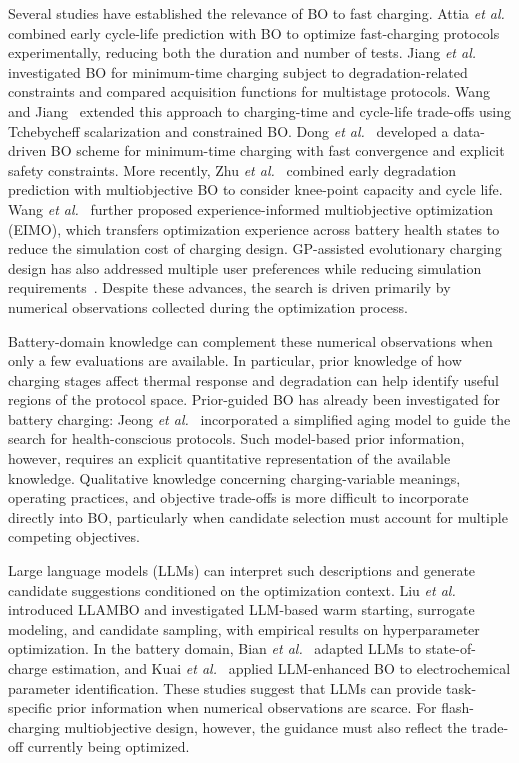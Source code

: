 Several studies have established the relevance of BO to fast charging.
Attia \emph{et al.}~\cite{nref3} combined early cycle-life prediction with BO
to optimize fast-charging protocols experimentally, reducing both the duration
and number of tests. Jiang \emph{et al.}~\cite{nref7} investigated BO for
minimum-time charging subject to degradation-related constraints and compared
acquisition functions for multistage protocols. Wang and Jiang~\cite{nref8}
extended this approach to charging-time and cycle-life trade-offs using
Tchebycheff scalarization and constrained BO. Dong \emph{et
al.}~\cite{refDongBO} developed a data-driven BO scheme for minimum-time
charging with fast convergence and explicit safety constraints. More recently,
Zhu \emph{et al.}~\cite{refZhuMOBO} combined early degradation prediction with
multiobjective BO to consider knee-point capacity and cycle life.
Wang \emph{et al.}~\cite{refEIMO} further proposed experience-informed
multiobjective optimization (EIMO), which transfers optimization experience
across battery health states to reduce the simulation cost of charging design.
GP-assisted evolutionary charging design has also addressed multiple user
preferences while reducing simulation requirements~\cite{refGPA}. Despite
these advances, the search is driven primarily by numerical observations
collected during the optimization process.

Battery-domain knowledge can complement these numerical observations when only
a few evaluations are available. In particular, prior knowledge of how
charging stages affect thermal response and degradation can help identify
useful regions of the protocol space. Prior-guided BO has already been
investigated for battery charging: Jeong \emph{et al.}~\cite{refPriorCharging}
incorporated a simplified aging model to guide the search for health-conscious
protocols. Such model-based prior information, however,
requires an explicit quantitative representation of the available knowledge.
Qualitative knowledge concerning charging-variable meanings, operating
practices, and objective trade-offs is more difficult to incorporate directly
into BO, particularly when candidate selection must account for multiple
competing objectives.

Large language models (LLMs) can interpret such descriptions and generate
candidate suggestions conditioned on the optimization context. Liu \emph{et
al.}~\cite{nref12} introduced LLAMBO and investigated LLM-based warm starting,
surrogate modeling, and candidate sampling, with empirical results on
hyperparameter optimization. In the battery domain, Bian \emph{et
al.}~\cite{refBianLLM} adapted LLMs to state-of-charge estimation, and Kuai
\emph{et al.}~\cite{refKuaiLLMBO} applied LLM-enhanced BO to electrochemical
parameter identification.
These studies suggest that LLMs can provide task-specific prior information when
numerical observations are scarce. For flash-charging multiobjective design, however,
the guidance must also reflect the trade-off currently being optimized.

